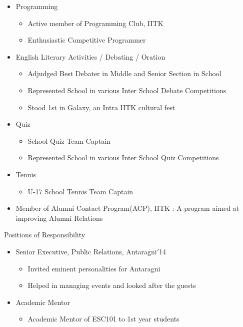 \documentclass{article}
\begin{document}
\begin{itemize}
\item Programming
	\begin{itemize}
	\item Active member of Programming Club, IITK
	\item Enthusiastic Competitive Programmer
	\end{itemize}
\item English Literary Activities / Debating / Oration
	\begin{itemize}
	\item Adjudged Best Debater in Middle and Senior Section in School
	\item Represented School in various Inter School Debate Competitions
	\item Stood 1st in Galaxy, an Intra IITK cultural fest 
	\end{itemize}
\item Quiz
	\begin{itemize}
	\item School Quiz Team Captain
	\item Represented School in various Inter School Quiz Competitions
	\end{itemize}
\item Tennis
	\begin{itemize}
	\item U-17 School Tennis Team Captain
	\end{itemize}
\item Member of Alumni Contact Program(ACP), IITK : A program aimed at improving Alumni Relations
\end{itemize}
\vspace{10pt}
{\Large Positions of Responsibility}
\begin{itemize}
\item Senior Executive, Public Relations, Antaragni$'$14
	\begin{itemize}
	\item Invited eminent personalities for Antaragni
	\item Helped in managing events and looked after the guests
	\end{itemize}
\item Academic Mentor
\begin{itemize}
\item Academic Mentor of ESC101 to 1st year students
\end{itemize}
\end{itemize}
\end{document}
